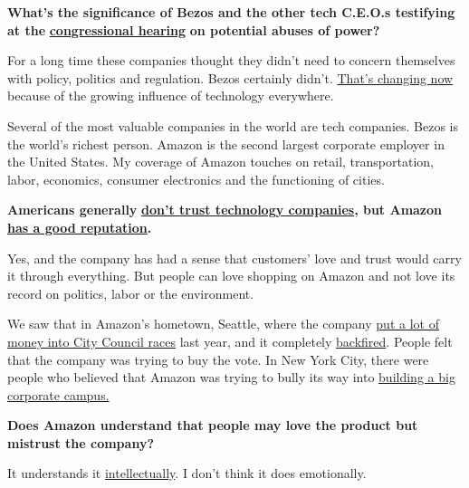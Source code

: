\textbf{What's the significance of Bezos and the other tech C.E.O.s
testifying at the}
\textbf{\href{https://www.nytimes3xbfgragh.onion/2020/07/28/technology/amazon-apple-facebook-google-antitrust-hearing.html}{congressional
hearing}} \textbf{on potential abuses of power?}

For a long time these companies thought they didn't need to concern
themselves with policy, politics and regulation. Bezos certainly didn't.
\href{https://www.nytimes3xbfgragh.onion/2020/07/27/business/jeff-bezos-amazon-congress.html}{That's
changing now} because of the growing influence of technology everywhere.

Several of the most valuable companies in the world are tech companies.
Bezos is the world's richest person. Amazon is the second largest
corporate employer in the United States. My coverage of Amazon touches
on retail, transportation, labor, economics, consumer electronics and
the functioning of cities.

\textbf{Americans generally}
\textbf{\href{https://knightfoundation.org/reports/techlash-americas-growing-concern-with-major-technology-companies/}{don't
trust technology companies}, but Amazon}
\textbf{\href{https://www.usatoday.com/story/money/2019/04/02/companies-with-the-best-and-worst-reputations/39271085/}{has
a good reputation}.}

Yes, and the company has had a sense that customers' love and trust
would carry it through everything. But people can love shopping on
Amazon and not love its record on politics, labor or the environment.

We saw that in Amazon's hometown, Seattle, where the company
\href{https://www.nytimes3xbfgragh.onion/2019/10/18/technology/amazon-seattle-council-election.html}{put
a lot of money into City Council races} last year, and it completely
\href{https://www.seattletimes.com/seattle-news/politics/amazon-lost-the-seattle-city-council-elections-after-a-1-million-power-play-will-it-see-a-new-head-tax/}{backfired}.
People felt that the company was trying to buy the vote. In New York
City, there were people who believed that Amazon was trying to bully its
way into
\href{https://www.nytimes3xbfgragh.onion/2019/02/14/nyregion/amazon-hq2-queens.html}{building
a big corporate campus.}

\textbf{Does Amazon understand that people may love the product but
mistrust the company?}

It understands it
\href{https://www.seattletimes.com/business/amazon/amazon-draws-praise-protests-at-annual-shareholders-meeting}{intellectually}.
I don't think it does emotionally.


